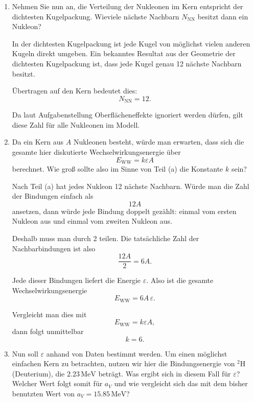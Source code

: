 \documentclass[11pt,a4paper]{scrartcl}
\begin{document}
\begin{enumerate}[label=(\alph*)]

    \item Nehmen Sie nun an, die Verteilung der Nukleonen im Kern entspricht der dichtesten Kugelpackung. Wieviele nächste Nachbarn $N_{\mathrm{NN}}$ besitzt dann ein Nukleon?

    \begin{solutionbox}
        In der dichtesten Kugelpackung ist jede Kugel von möglichst vielen anderen Kugeln direkt umgeben.
        Ein bekanntes Resultat aus der Geometrie der dichtesten Kugelpackung ist, dass jede Kugel genau 12 nächste Nachbarn besitzt.

        Übertragen auf den Kern bedeutet dies:
        \[
            N_{\mathrm{NN}}=12.
        \]

        Da laut Aufgabenstellung Oberflächeneffekte ignoriert werden dürfen, gilt diese Zahl für alle Nukleonen im Modell.
    \end{solutionbox}

    \item Da ein Kern aus $A$ Nukleonen besteht, würde man erwarten, dass sich die gesamte hier diskutierte Wechselwirkungsenergie über
    \[
        E_{\mathrm{WW}}=k\varepsilon A
    \]
    berechnet. Wie groß sollte also im Sinne von Teil (a) die Konstante $k$ sein?

    \begin{solutionbox}
        Nach Teil (a) hat jedes Nukleon 12 nächste Nachbarn.
        Würde man die Zahl der Bindungen einfach als
        \[
            12A
        \]
        ansetzen, dann würde jede Bindung doppelt gezählt:
        einmal vom ersten Nukleon aus und einmal vom zweiten Nukleon aus.

        Deshalb muss man durch 2 teilen. Die tatsächliche Zahl der Nachbarbindungen ist also
        \[
            \frac{12A}{2}=6A.
        \]

        Jede dieser Bindungen liefert die Energie $\varepsilon$.
        Also ist die gesamte Wechselwirkungsenergie
        \[
            E_{\mathrm{WW}}=6A\,\varepsilon.
        \]

        Vergleicht man dies mit
        \[
            E_{\mathrm{WW}}=k\varepsilon A,
        \]
        dann folgt unmittelbar
        \[
            \boxed{k=6}.
        \]
    \end{solutionbox}

    \item Nun soll $\varepsilon$ anhand von Daten bestimmt werden. Um einen möglichst einfachen Kern zu betrachten, nutzen wir hier die Bindungsenergie von ${}^2\mathrm{H}$ (Deuterium), die $2.23\,\mathrm{MeV}$ beträgt. Was ergibt sich in diesem Fall für $\varepsilon$? Welcher Wert folgt somit für $a_V$ und wie vergleicht sich das mit dem bisher benutzten Wert von $a_V=15.85\,\mathrm{MeV}$?


\end{enumerate}
\end{document}
